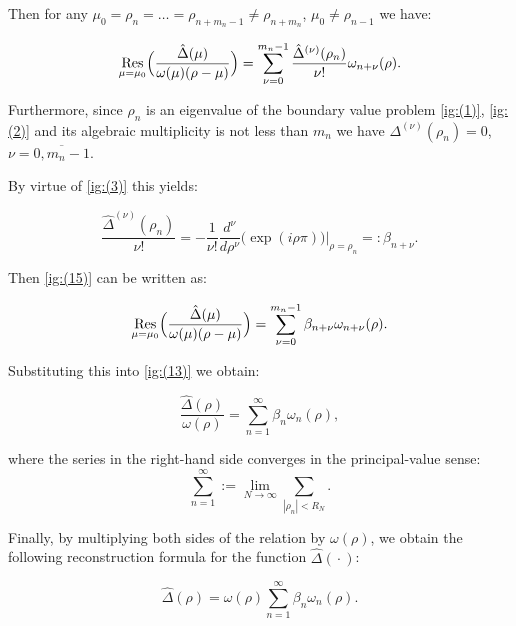  Then for any $\mu_0=\rho_n=\dots=\rho_{n+m_n-1}\neq\rho_{n+m_n}$, $\mu_0\neq\rho_{n-1}$ we have:

\begin{equation}

\mathop{\rm Res}_{\mu=\mu_0}\Bigl(\frac{\hat\Delta(\mu)}{\omega(\mu)(\rho-\mu)}\Bigr)=\sum\limits_{\nu=0}^{m_n-1}

\frac{\hat\Delta^{(\nu)}(\rho_n)}{\nu !}\omega_{n+\nu}(\rho). 

\label{ig:(15)}

\end{equation}

Furthermore, since $\rho_n$ is an eigenvalue of the boundary value problem \eqref{ig:(1)}, \eqref{ig:(2)}  and its algebraic multiplicity is not less than  $m_n$ we have $\Delta^{(\nu)}(\rho_n)=0$, $\nu=\overline{0,m_n-1}$. 

By virtue of \eqref{ig:(3)}  this yields:

\begin{equation}

\frac{\hat\Delta^{(\nu)}(\rho_n)}{\nu !}=-\frac{1}{\nu !} \frac{d^{\nu}}{d\rho^\nu}\bigl(\exp(i\rho\pi)\bigr)\Bigr|_{\rho=\rho_n}=:\beta_{n+\nu}. 

\label{ig:(16)}

\end{equation}

Then \eqref{ig:(15)} can be written as:

$$

\mathop{\rm Res}_{\mu=\mu_0}\Bigl(\frac{\hat\Delta(\mu)}{\omega(\mu)(\rho-\mu)}\Bigr)

=\sum\limits_{\nu=0}^{m_n-1}

\beta_{n+\nu}\omega_{n+\nu}(\rho).

$$

Substituting this into \eqref{ig:(13)} we obtain:

$$

\frac{\hat\Delta(\rho)}{\omega(\rho)}=\sum\limits_{n=1}^\infty \beta_n \omega_n(\rho),

$$

where the series in the right-hand side converges in the principal-value sense: $$\sum_{n=1}^\infty:=\lim_{N\to\infty}\sum_{|\rho_n|<R_N}.$$ 

Finally, by multiplying both sides of the  relation by $\omega(\rho)$, we obtain the following reconstruction formula for the function $\hat\Delta({}\cdot{})$:

\begin{equation}

\hat\Delta(\rho)=\omega(\rho)\sum\limits_{n=1}^\infty \beta_n \omega_n(\rho).

\label{ig:(17)}

\end{equation}

